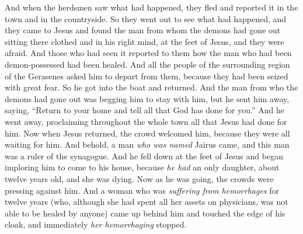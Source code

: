 \begin{biblechapter}
\verse And when the herdsmen saw what had happened, they fled and reported it in the town and in the countryside.
\verse So they went out to see what had happened, and they came to Jesus and found the man from whom the demons had gone out sitting there clothed and in his right mind, at the feet of Jesus, and they were afraid.
\verse And those who had seen it reported to them how the man who had been demon-possessed had been healed.
\verse And all the people of the surrounding region of the Gerasenes asked him to depart from them, because they had been seized with great fear. So he got into the boat and returned.
\verse And the man from who the demons had gone out was begging him to stay with him, but he sent him away, saying,
\verse “Return to your home and tell all that God has done for you.” And he went away, proclaiming throughout the whole town all that Jesus had done for him.
 Now when Jesus returned, the crowd welcomed him, because they were all waiting for him.
\verse And behold, a man \textit{who was named} Jairus came, and this man was a ruler of the synagogue. And he fell down at the feet of Jesus and began imploring him to come to his house,
\verse because \textit{he had} an only daughter, about twelve years old, and she was dying.
\verse Now as he was going, the crowds were pressing against him.
\verse And a woman who was \textit{suffering from hemorrhages} for twelve years (who, although she had spent all her assets on physicians, was not able to be healed by anyone)
\verse came up behind him and touched the edge of his cloak, and immediately \textit{her hemorrhaging} stopped.

\end{biblechapter}
